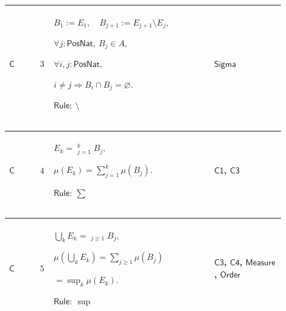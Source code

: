 \documentclass[12pt,reqno]{amsart}
\theoremstyle{blueplain}
\numberwithin{equation}{section}
\begin{document}
{\scriptsize \setlength{\parskip}{0pt}\nointerlineskip
\noindent 
\begin{tabular}{|@{}>{\centering\arraybackslash}m{0.10658\linewidth}|>{\centering\arraybackslash}m{0.03553\linewidth}|>{\centering\arraybackslash}m{0.52105\linewidth}|>{\centering\arraybackslash}m{0.23684\linewidth}|}
\hline
\hypertarget{proof:C3}{$\displaystyle \mathsf{C}$} & $\displaystyle 3$ & $%
\displaystyle B_1:=E_1,\quad B_{j+1}:=E_{j+1}\setminus E_j,$\par$%
\displaystyle \forall j:\mathsf{PosNat},\ B_j\in A,$\par$\displaystyle %
\forall i,j:\mathsf{PosNat},$\par$\displaystyle i\ne j\Rightarrow B_i\cap
B_j=\varnothing.$\par$\displaystyle \mathsf{Rule}:\ \setminus$ & \hyperlink{ax:Sigma}%
{$\displaystyle \mathsf{Sigma}$} \\ \hline
\end{tabular}%
}

{\scriptsize \setlength{\parskip}{0pt}\nointerlineskip
\noindent 
\begin{tabular}{|@{}>{\centering\arraybackslash}m{0.10658\linewidth}|>{\centering\arraybackslash}m{0.03553\linewidth}|>{\centering\arraybackslash}m{0.52105\linewidth}|>{\centering\arraybackslash}m{0.23684\linewidth}|}
\hline
\hypertarget{proof:C4}{$\displaystyle \mathsf{C}$} & $\displaystyle 4$ & $%
\displaystyle E_k=\mathop{\dot\bigcup}_{j=1}^kB_j,$\par$\displaystyle %
\mu(E_k)=\sum_{j=1}^k\mu(B_j).$\par$\displaystyle \mathsf{Rule}:\ \sum$ & 
\hyperlink{proof:C1}{$\displaystyle \mathsf{C1}$}, \hyperlink{proof:C3}{$%
\displaystyle \mathsf{C3}$} \\ \hline
\end{tabular}%
}

{\scriptsize \setlength{\parskip}{0pt}\nointerlineskip
\noindent 
\begin{tabular}{|@{}>{\centering\arraybackslash}m{0.10658\linewidth}|>{\centering\arraybackslash}m{0.03553\linewidth}|>{\centering\arraybackslash}m{0.52105\linewidth}|>{\centering\arraybackslash}m{0.23684\linewidth}|}
\hline
\hypertarget{proof:C5}{$\displaystyle \mathsf{C}$} & $\displaystyle 5$ & $%
\displaystyle \bigcup_kE_k=\mathop{\dot\bigcup}_{j\ge1}B_j,$\par$%
\displaystyle \mu(\bigcup_kE_k)=\sum_{j\ge1}\mu(B_j)$\par$\displaystyle %
{}=\sup_k\mu(E_k).$\par$\displaystyle \mathsf{Rule}:\ \sup$ & \hyperlink{proof:C3}%
{$\displaystyle \mathsf{C3}$}, \hyperlink{proof:C4}{$\displaystyle \mathsf{C4%
}$}, \hyperlink{ax:Measure}{$\displaystyle \mathsf{Measure}$}, \hyperlink{ax:Order}%
{$\displaystyle \mathsf{Order}$} \\ \hline
\end{tabular}%
}
\end{document}
